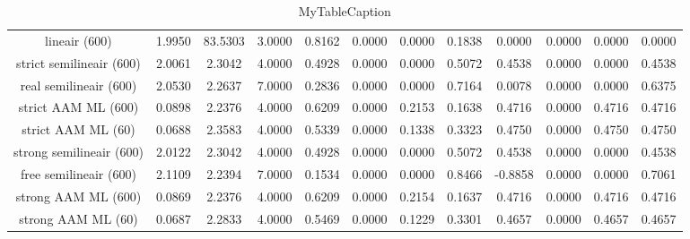 \begin{table}
\centering
\begin{tabular}{|c|c|c|c|c|c|c|c|c|c|c|c|}
\hline
 &  &  &  &  &  &  &  &  &  &  &  \\
\hline
lineair (600) & 1.9950 & 83.5303 & 3.0000 & 0.8162 & 0.0000 & 0.0000 & 0.1838 & 0.0000 & 0.0000 & 0.0000 & 0.0000 \\
\hline
strict semilineair (600) & 2.0061 & 2.3042 & 4.0000 & 0.4928 & 0.0000 & 0.0000 & 0.5072 & 0.4538 & 0.0000 & 0.0000 & 0.4538 \\
\hline
real semilineair (600) & 2.0530 & 2.2637 & 7.0000 & 0.2836 & 0.0000 & 0.0000 & 0.7164 & 0.0078 & 0.0000 & 0.0000 & 0.6375 \\
\hline
strict AAM ML (600) & 0.0898 & 2.2376 & 4.0000 & 0.6209 & 0.0000 & 0.2153 & 0.1638 & 0.4716 & 0.0000 & 0.4716 & 0.4716 \\
\hline
strict AAM ML (60) & 0.0688 & 2.3583 & 4.0000 & 0.5339 & 0.0000 & 0.1338 & 0.3323 & 0.4750 & 0.0000 & 0.4750 & 0.4750 \\
\hline
strong semilineair (600) & 2.0122 & 2.3042 & 4.0000 & 0.4928 & 0.0000 & 0.0000 & 0.5072 & 0.4538 & 0.0000 & 0.0000 & 0.4538 \\
\hline
free semilineair (600) & 2.1109 & 2.2394 & 7.0000 & 0.1534 & 0.0000 & 0.0000 & 0.8466 & -0.8858 & 0.0000 & 0.0000 & 0.7061 \\
\hline
strong AAM ML (600) & 0.0869 & 2.2376 & 4.0000 & 0.6209 & 0.0000 & 0.2154 & 0.1637 & 0.4716 & 0.0000 & 0.4716 & 0.4716 \\
\hline
strong AAM ML (60) & 0.0687 & 2.2833 & 4.0000 & 0.5469 & 0.0000 & 0.1229 & 0.3301 & 0.4657 & 0.0000 & 0.4657 & 0.4657 \\
\hline
\end{tabular}
\caption{MyTableCaption}
\label{table:MyTableLabel}
\end{table}
